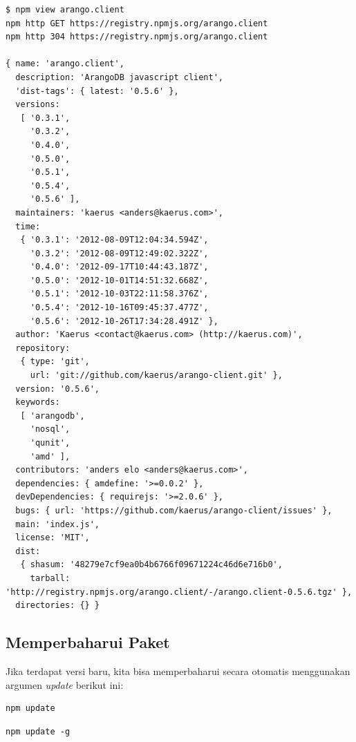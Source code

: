 \lstset{language=bash,caption=Menampilkan rincian suatu paket dalam format JSON}
\begin{lstlisting}
$ npm view arango.client
npm http GET https://registry.npmjs.org/arango.client
npm http 304 https://registry.npmjs.org/arango.client

{ name: 'arango.client',
  description: 'ArangoDB javascript client',
  'dist-tags': { latest: '0.5.6' },
  versions: 
   [ '0.3.1',
     '0.3.2',
     '0.4.0',
     '0.5.0',
     '0.5.1',
     '0.5.4',
     '0.5.6' ],
  maintainers: 'kaerus <anders@kaerus.com>',
  time: 
   { '0.3.1': '2012-08-09T12:04:34.594Z',
     '0.3.2': '2012-08-09T12:49:02.322Z',
     '0.4.0': '2012-09-17T10:44:43.187Z',
     '0.5.0': '2012-10-01T14:51:32.668Z',
     '0.5.1': '2012-10-03T22:11:58.376Z',
     '0.5.4': '2012-10-16T09:45:37.477Z',
     '0.5.6': '2012-10-26T17:34:28.491Z' },
  author: 'Kaerus <contact@kaerus.com> (http://kaerus.com)',
  repository: 
   { type: 'git',
     url: 'git://github.com/kaerus/arango-client.git' },
  version: '0.5.6',
  keywords: 
   [ 'arangodb',
     'nosql',
     'qunit',
     'amd' ],
  contributors: 'anders elo <anders@kaerus.com>',
  dependencies: { amdefine: '>=0.0.2' },
  devDependencies: { requirejs: '>=2.0.6' },
  bugs: { url: 'https://github.com/kaerus/arango-client/issues' },
  main: 'index.js',
  license: 'MIT',
  dist: 
   { shasum: '48279e7cf9ea0b4b6766f09671224c46d6e716b0',
     tarball: 'http://registry.npmjs.org/arango.client/-/arango.client-0.5.6.tgz' },
  directories: {} }
\end{lstlisting}

\subsection{Memperbaharui Paket}

Jika terdapat versi baru, kita bisa memperbaharui secara otomatis menggunakan argumen \textit{update} berikut ini:

\lstset{language=bash,caption=Memperbaharui paket lokal}
\begin{lstlisting}
npm update
\end{lstlisting}

\lstset{language=bash, caption=Memperbaharui paket secara global}
\begin{lstlisting}
npm update -g
\end{lstlisting}
